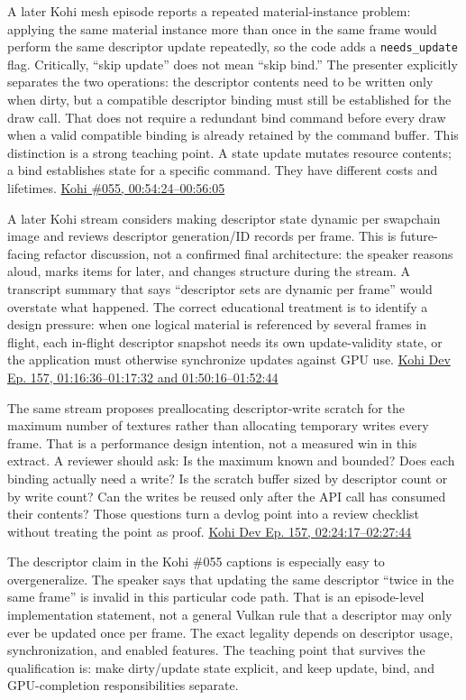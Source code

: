 A later Kohi mesh episode reports a repeated material-instance problem: applying the same material instance more than once in the same frame would perform the same descriptor update repeatedly, so the code adds a \texttt{needs\_update} flag. Critically, ``skip update'' does not mean ``skip bind.'' The presenter explicitly separates the two operations: the descriptor contents need to be written only when dirty, but a compatible descriptor binding must still be established for the draw call. That does not require a redundant bind command before every draw when a valid compatible binding is already retained by the command buffer. This distinction is a strong teaching point. A state update mutates resource contents; a bind establishes state for a specific command. They have different costs and lifetimes. \href{https://www.youtube.com/watch?v=kIbW4Kv6p4c&t=54m24s}{Kohi \#055, 00:54:24--00:56:05}

A later Kohi stream considers making descriptor state dynamic per swapchain image and reviews descriptor generation/ID records per frame. This is future-facing refactor discussion, not a confirmed final architecture: the speaker reasons aloud, marks items for later, and changes structure during the stream. A transcript summary that says ``descriptor sets are dynamic per frame'' would overstate what happened. The correct educational treatment is to identify a design pressure: when one logical material is referenced by several frames in flight, each in-flight descriptor snapshot needs its own update-validity state, or the application must otherwise synchronize updates against GPU use. \href{https://www.youtube.com/watch?v=ZmZUmsqUN6Q&t=1h16m36s}{Kohi Dev Ep. 157, 01:16:36--01:17:32 and 01:50:16--01:52:44}

The same stream proposes preallocating descriptor-write scratch for the maximum number of textures rather than allocating temporary writes every frame. That is a performance design intention, not a measured win in this extract. A reviewer should ask: Is the maximum known and bounded? Does each binding actually need a write? Is the scratch buffer sized by descriptor count or by write count? Can the writes be reused only after the API call has consumed their contents? Those questions turn a devlog point into a review checklist without treating the point as proof. \href{https://www.youtube.com/watch?v=ZmZUmsqUN6Q&t=2h24m17s}{Kohi Dev Ep. 157, 02:24:17--02:27:44}

The descriptor claim in the Kohi \#055 captions is especially easy to overgeneralize. The speaker says that updating the same descriptor ``twice in the same frame'' is invalid in this particular code path. That is an episode-level implementation statement, not a general Vulkan rule that a descriptor may only ever be updated once per frame. The exact legality depends on descriptor usage, synchronization, and enabled features. The teaching point that survives the qualification is: make dirty/update state explicit, and keep update, bind, and GPU-completion responsibilities separate.

